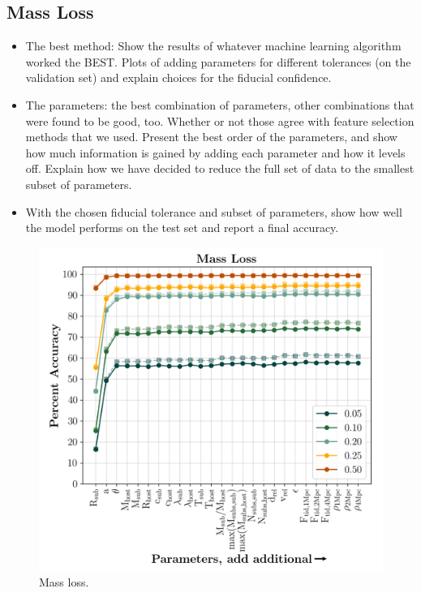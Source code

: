 \documentclass[fleqn,usenatbib]{mnras}
\begin{document}
\subsection{Mass Loss}
\label{sec:mass loss}
\begin{itemize}
	\item The best method: Show the results of whatever machine learning algorithm worked the BEST. Plots of adding parameters for different tolerances (on the validation set) and explain choices for the fiducial confidence.
	\item The parameters: the best combination of parameters, other combinations that were found to be good, too. Whether or not those agree with feature selection methods that we used. Present the best order of the parameters, and show how much information is gained by adding each parameter and how it levels off. Explain how we have decided to reduce the full set of data to the smallest subset of parameters.
    \item With the chosen fiducial tolerance and subset of parameters, show how well the model performs on the test set and report a final accuracy.
\end{itemize}

\begin{figure}
	\includegraphics[width=\columnwidth]{Figures/massloss_predictions}
    \caption{Mass loss.}
    \label{fig:massloss_predictions}
\end{figure}
\end{document}
